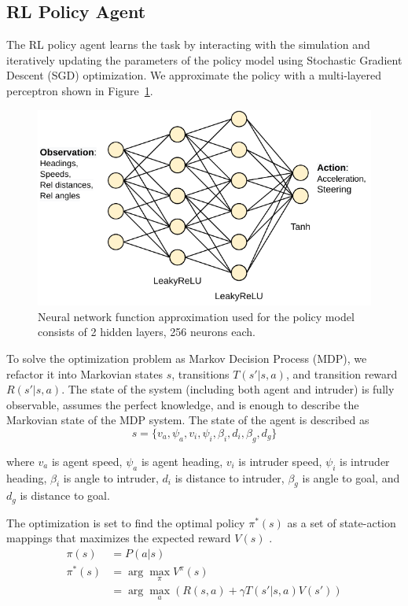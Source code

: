 \subsection{RL Policy Agent}

The RL policy agent learns the task by interacting with the simulation and iteratively updating the parameters of the policy model using Stochastic Gradient Descent (SGD) optimization. We approximate the policy with a multi-layered perceptron shown in Figure~\ref{fig:policy_model}.

\begin{figure}[h]
	\centering
	\includegraphics[width=0.8\columnwidth]{figures/model.pdf}
	\caption{Neural network function approximation used for the policy model consists of 2 hidden layers, 256 neurons each.}
	\label{fig:policy_model}
\end{figure}

To solve the optimization problem as Markov Decision Process (MDP), we refactor it into Markovian states $s$, transitions  $T(s' | s, a)$, and transition reward $R(s' | s, a)$. 
The state of the system (including both agent and intruder) is fully observable, assumes the perfect knowledge, and is enough to describe the Markovian state of the MDP system.
The state of the agent is described as
$$ s = \{ v_a, \psi_a, v_i, \psi_i, \beta_i, d_i, \beta_g, d_g \}$$

\noindent where 
$v_a$ is agent speed,
$\psi_a$ is agent heading,
$v_i$ is intruder speed,
$\psi_i$ is intruder heading,
$\beta_i$ is angle to intruder,
$d_i$ is distance to intruder,
$\beta_g$ is angle to goal, and
$d_g$ is distance to goal. 

The optimization is set to find the optimal policy $\pi^*(s)$ as a set of state-action mappings that maximizes the expected reward $V(s)$ \cite{sutton2018reinforcement}.
\begin{align} 
	\pi(s) &= P(a | s) \\
	\pi^*(s) &= \arg\max_{\pi} V^\pi (s) \\
	&= \arg\max_a \left( R(s,a) + \gamma T(s'|s,a) V(s') \right)
\end{align} 

